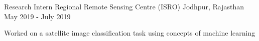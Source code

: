 
\begin{cventries}
  \cventry
    {Research Intern} %
    {Regional Remote Sensing Centre (ISRO)} %
    {Jodhpur, Rajasthan} %
    {May 2019 - July 2019} %
    {
      \begin{cvitems} %
        \item {Worked on a satellite image classification task using concepts of machine learning}
      \end{cvitems}
    }
\end{cventries}

